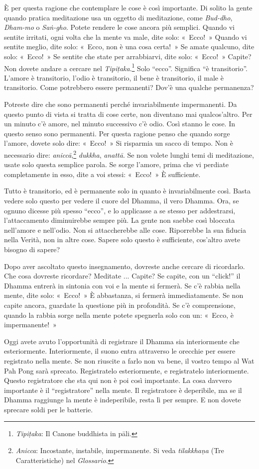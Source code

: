 È per questa ragione che contemplare le cose è così importante. Di
solito la gente quando pratica meditazione usa un oggetto di
meditazione, come \emph{Bud-dho}, \emph{Dham-mo} o \emph{Saṅ-gho}.
Potete rendere le cose ancora più semplici. Quando vi sentite irritati,
ogni volta che la mente va male, dite solo: «~Ecco!~» Quando vi sentite
meglio, dite solo: «~Ecco, non è una cosa certa!~» Se amate qualcuno,
dite solo: «~Ecco!~» Se sentite che state per arrabbiarvi, dite solo:
«~Ecco!~» Capite? Non dovete andare a cercare nel
\emph{Tipiṭaka}.\footnote{\emph{Tipiṭaka}: Il Canone buddhista in pāli.}
Solo ``ecco''. Significa ``è transitorio''. L'amore è transitorio,
l'odio è transitorio, il bene è transitorio, il male è transitorio. Come
potrebbero essere permanenti? Dov'è una qualche permanenza?

Potreste dire che sono permanenti perché invariabilmente impermanenti.
Da questo punto di vista si tratta di cose certe, non diventano mai
qualcos'altro. Per un minuto c'è amore, nel minuto successivo c'è odio.
Così stanno le cose. In questo senso sono permanenti. Per questa ragione
penso che quando sorge l'amore, dovete solo dire: «~Ecco!~» Si risparmia
un sacco di tempo. Non è necessario dire: \emph{aniccā},\footnote{\emph{Anicca}:
  Incostante, instabile, impermanente. Si veda \emph{tilakkhaṇa} (Tre
  Caratteristiche) nel \emph{Glossario}.} \emph{dukkha}, \emph{anattā}.
Se non volete lunghi temi di meditazione, usate solo questa semplice
parola. Se sorge l'amore, prima che vi perdiate completamente in esso,
dite a voi stessi: «~Ecco!~» È sufficiente.

Tutto è transitorio, ed è permanente solo in quanto è invariabilmente
così. Basta vedere solo questo per vedere il cuore del Dhamma, il vero
Dhamma. Ora, se ognuno dicesse più spesso ``ecco'', e lo applicasse a se
stesso per addestrarsi, l'attaccamento diminuirebbe sempre più. La gente
non saebbe così bloccata nell'amore e nell'odio. Non si attaccherebbe
alle cose. Riporrebbe la sua fiducia nella Verità, non in altre cose.
Sapere solo questo è sufficiente, cos'altro avete bisogno di sapere?

Dopo aver ascoltato questo insegnamento, dovreste anche cercare di
ricordarlo. Che cosa dovreste ricordare? Meditate ... Capite? Se capite,
con un ``click!'' il Dhamma entrerà in sintonia con voi e la mente si
fermerà. Se c'è rabbia nella mente, dite solo: «~Ecco!~» È abbastanza,
si fermerà immediatamente. Se non capite ancora, guardate la questione
più in profondità. Se c'è comprensione, quando la rabbia sorge nella
mente potete spegnerla solo con un: «~Ecco, è impermanente!~»

Oggi avete avuto l'opportunità di registrare il Dhamma sia interiormente
che esteriormente. Interiormente, il suono entra attraverso le orecchie
per essere registrato nella mente. Se non riuscite a farlo non va bene,
il vostro tempo al Wat Pah Pong sarà sprecato. Registratelo
esteriormente, e registratelo interiormente. Questo registratore che sta
qui non è poi così importante. La cosa davvero importante è il
``registratore'' nella mente. Il registratore è deperibile, ma se il
Dhamma raggiunge la mente è indeperibile, resta lì per sempre. E non
dovete sprecare soldi per le batterie.

